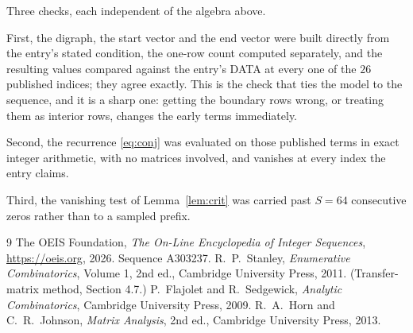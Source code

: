 \documentclass[11pt,a4paper]{article}
\theoremstyle{plain}
\theoremstyle{definition}
\begin{document}
Three checks, each independent of the algebra above.

First, the digraph, the start vector and the end vector were built directly from the
entry's stated condition, the one-row count computed separately, and the resulting values
compared against the entry's DATA at every one of the $26$ published indices; they
agree exactly. This is the check that ties the model to the sequence, and it is a sharp one:
getting the boundary rows wrong, or treating them as interior rows, changes the early terms
immediately.

Second, the recurrence \eqref{eq:conj} was evaluated on those published terms in exact
integer arithmetic, with no matrices involved, and vanishes at every index the entry claims.

Third, the vanishing test of Lemma~\ref{lem:crit} was carried past $S=64$ consecutive
zeros rather than to a sampled prefix.

\begin{thebibliography}{9}
 The OEIS Foundation, \emph{The On-Line Encyclopedia of Integer
Sequences}, \url{https://oeis.org}, 2026. Sequence A303237.
 R.~P.~Stanley, \emph{Enumerative Combinatorics}, Volume 1, 2nd ed.,
Cambridge University Press, 2011. (Transfer-matrix method, Section 4.7.)
 P.~Flajolet and R.~Sedgewick, \emph{Analytic Combinatorics}, Cambridge
University Press, 2009.
 R.~A.~Horn and C.~R.~Johnson, \emph{Matrix Analysis}, 2nd ed., Cambridge
University Press, 2013.
\end{thebibliography}
\end{document}
